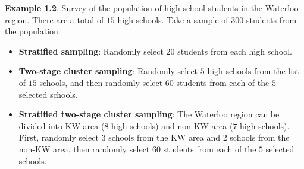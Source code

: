 \documentclass[oneside]{book}\usepackage[]{graphicx}\usepackage[svgnames]{xcolor}
\begin{document}
\begin{Example}{}
      \textbf{Example 1.2}. Survey of the population of high school students in the
      Waterloo region. There are a total of $15$ high schools. Take a sample
      of $300$ students from the population.
      \tcblower{}
      \begin{itemize}
            \item \textbf{Stratified sampling}: Randomly select $20$ students from each high school.
            \item \textbf{Two-stage cluster sampling}: Randomly select $5$ high schools from the list of $15$ schools,
                  and then randomly select $60$ students from each of the $5$ selected
                  schools.
            \item \textbf{Stratified two-stage cluster sampling}: The Waterloo region can be divided into KW area ($8$ high
                  schools) and non-KW area ($7$ high schools). First, randomly select $3$
                  schools from the KW area and 2 schools from the non-KW area, then
                  randomly select $60$ students from each of the $5$ selected schools.
      \end{itemize}
\end{Example}
\end{document}
